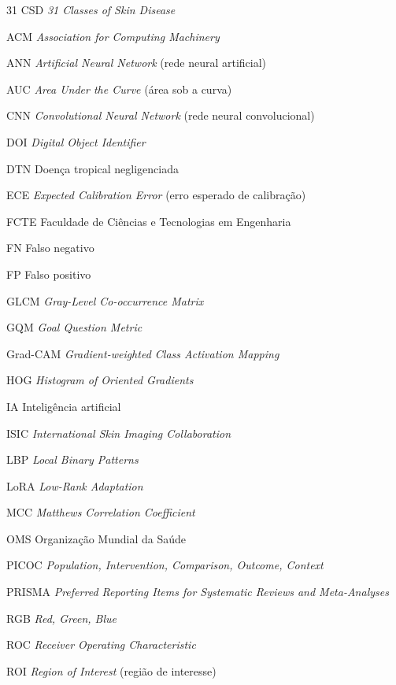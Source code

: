 \begin{siglas}
  \item[31 CSD] \textit{31 Classes of Skin Disease}
  \item[ACM] \textit{Association for Computing Machinery}
  \item[ANN] \textit{Artificial Neural Network} (rede neural artificial)
  \item[AUC] \textit{Area Under the Curve} (área sob a curva)
  \item[CNN] \textit{Convolutional Neural Network} (rede neural convolucional)
  \item[DOI] \textit{Digital Object Identifier}
  \item[DTN] Doença tropical negligenciada
  \item[ECE] \textit{Expected Calibration Error} (erro esperado de calibração)
  \item[FCTE] Faculdade de Ciências e Tecnologias em Engenharia
  \item[FN] Falso negativo
  \item[FP] Falso positivo
  \item[GLCM] \textit{Gray-Level Co-occurrence Matrix}
  \item[GQM] \textit{Goal Question Metric}
  \item[Grad-CAM] \textit{Gradient-weighted Class Activation Mapping}
  \item[HOG] \textit{Histogram of Oriented Gradients}
  \item[IA] Inteligência artificial
  \item[ISIC] \textit{International Skin Imaging Collaboration}
  \item[LBP] \textit{Local Binary Patterns}
  \item[LoRA] \textit{Low-Rank Adaptation}
  \item[MCC] \textit{Matthews Correlation Coefficient}
  \item[OMS] Organização Mundial da Saúde
  \item[PICOC] \textit{Population, Intervention, Comparison, Outcome, Context}
  \item[PRISMA] \textit{Preferred Reporting Items for Systematic Reviews and Meta-Analyses}
  \item[RGB] \textit{Red, Green, Blue}
  \item[ROC] \textit{Receiver Operating Characteristic}
  \item[ROI] \textit{Region of Interest} (região de interesse)

\end{siglas}
